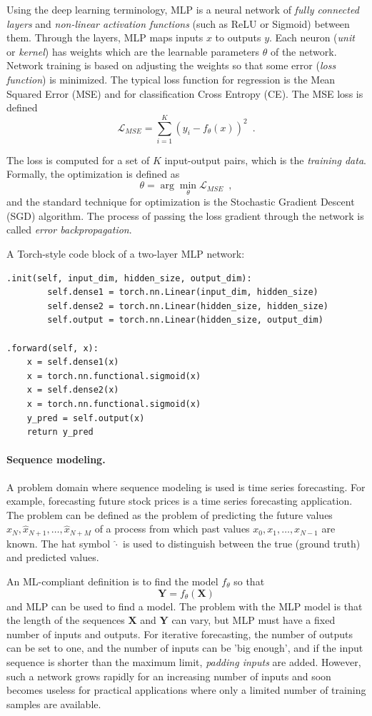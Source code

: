 \documentclass[final]{article}
\begin{document}
Using the deep learning terminology, MLP is a neural network of
\textit{fully connected layers} and \textit{non-linear activation
  functions} (such as ReLU or Sigmoid) between them. Through the
layers, MLP maps inputs $x$ to outputs $y$. Each neuron (\textit{unit}
or \textit{kernel}) has weights which are the learnable
parameters $\theta$ of the network. Network training is based on
adjusting the weights so that some error (\textit{loss function})
is minimized. The typical loss function for regression is the Mean
Squared Error (MSE) and for classification Cross Entropy (CE). The MSE
loss is defined
\[
\mathcal{L}_{MSE} = \sum_{i=1}^{K} (y_i-f_\theta (x))^2 \enspace .
\]


The loss is computed for a set of $K$ input-output pairs, which is
the \textit{training data}. Formally, the optimization is defined
as
\[
\theta = \arg\min_{\theta} \mathcal{L}_{MSE} \enspace ,
\]
and the standard technique for optimization is the Stochastic Gradient
Descent (SGD) algorithm. The process of passing the loss gradient
through the network is called \textit{error backpropagation}.

A Torch-style code block of a two-layer MLP network:
\begin{lstlisting}
.init(self, input_dim, hidden_size, output_dim):
        self.dense1 = torch.nn.Linear(input_dim, hidden_size)
        self.dense2 = torch.nn.Linear(hidden_size, hidden_size)
        self.output = torch.nn.Linear(hidden_size, output_dim)

.forward(self, x):
    x = self.dense1(x)
    x = torch.nn.functional.sigmoid(x)
    x = self.dense2(x)
    x = torch.nn.functional.sigmoid(x)
    y_pred = self.output(x)
    return y_pred
\end{lstlisting}



\paragraph{Sequence modeling.}
A problem domain where sequence modeling is used is time series
forecasting. For example, forecasting future stock prices is a time
series forecasting application. The problem can be defined as the
problem of predicting the future values
$\hat{x}_N, \hat{x}_{N+1}, \ldots, \hat{x}_{N+M}$ of a process
from which past values $x_0, x_{1}, \ldots, x_{N-1}$ are known.
The hat symbol $\hat{\cdot}$ is used to distinguish between the true
(ground truth) and predicted values.

An ML-compliant definition is to find the model $f_\theta$ so that
\[
\mathbf{Y} = f_\theta (\mathbf{X}) 
\]
and MLP can be used to find a model. The problem with the MLP model is
that the length of the sequences $\mathbf{X}$ and $\mathbf{Y}$ can vary,
but MLP must have a fixed number of inputs and outputs. For iterative
forecasting, the number of outputs can be set to one, and the number
of inputs can be 'big enough', and if the input sequence is
shorter than the maximum limit, \textit{padding inputs} are added.
However, such a network grows rapidly for an increasing number of
inputs and soon becomes useless for practical applications where only
a limited number of training samples are available.
\end{document}
